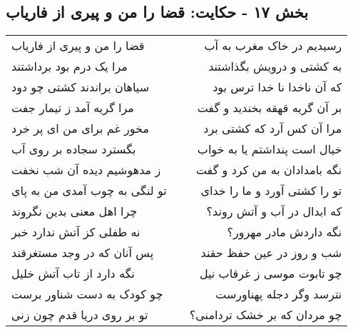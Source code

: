 \begin{center}
\section*{بخش ۱۷ - حکایت: قضا را من و پیری از فاریاب}
\label{sec:017}
\begin{longtable}{l p{0.5cm} r}
قضا را من و پیری از فاریاب
&&
رسیدیم در خاک مغرب به آب
\\
مرا یک درم بود برداشتند
&&
به کشتی و درویش بگذاشتند
\\
سیاهان براندند کشتی چو دود
&&
که آن ناخدا نا خدا ترس بود
\\
مرا گریه آمد ز تیمار جفت
&&
بر آن گریه قهقه بخندید و گفت
\\
مخور غم برای من ای پر خرد
&&
مرا آن کس آرد که کشتی برد
\\
بگسترد سجاده بر روی آب
&&
خیال است پنداشتم یا به خواب
\\
ز مدهوشیم دیده آن شب نخفت
&&
نگه بامدادان به من کرد و گفت
\\
تو لنگی به چوب آمدی من به پای
&&
تو را کشتی آورد و ما را خدای
\\
چرا اهل معنی بدین نگروند
&&
که ابدال در آب و آتش روند؟
\\
نه طفلی کز آتش ندارد خبر
&&
نگه داردش مادر مهرور؟
\\
پس آنان که در وجد مستغرقند
&&
شب و روز در عین حفظ حقند
\\
نگه دارد از تاب آتش خلیل
&&
چو تابوت موسی ز غرقاب نیل
\\
چو کودک به دست شناور برست
&&
نترسد وگر دجله پهناورست
\\
تو بر روی دریا قدم چون زنی
&&
چو مردان که بر خشک تردامنی؟
\\
\end{longtable}
\end{center}
